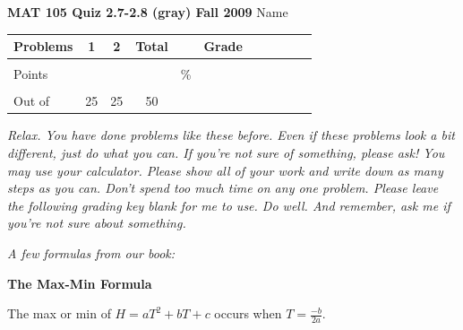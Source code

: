 \documentclass[11pt]{article}
\begin{document}
{\bf MAT 105 Quiz 2.7-2.8 (gray) Fall 2009} \hspace{.4in} {\large Name} \hrulefill

\hrulefill


\begin{center}

\begin{tabular}
{|l|c|c|c|c|c|c|c|c|c|c|} \hline

 Problems & \hspace{5 pt} 1 \hspace{5 pt}  & \hspace{5 pt} 2 \hspace{5 pt} &  \hspace{5 pt} Total  \hspace{5 pt} & &  \hspace{5 pt} Grade \hspace{5 pt}  \\ \hline
&&& &&\\  
Points &&& &    \hspace{.8in}\% &  \\ 
&&& && \\  \hline
Out of & 25 & 25  &50 & & \\ \hline

\end {tabular}
 
\end{center}

 \emph{Relax.  You have done problems like these before.  Even if these problems look a bit different, just do what you can.  If you're not sure of something, please ask! You may use your calculator.  Please show all of your work and write down as many steps as you can.  Don't spend too much time on any one problem.  Please leave the following grading key blank for me to use.  Do well.  And remember, ask me if you're not sure about something.}
 
 \vspace{.1in}
 
 \emph{A few formulas from our book:}
  \vspace{.2in}
 
  \begin{center}
\textbf{The Max-Min Formula}
\vspace{.1in}

The max or min of $H=aT^2+bT+c$ occurs when $\displaystyle T=\frac{-b}{2a}$.

 \end{center}
 
\end{document}
